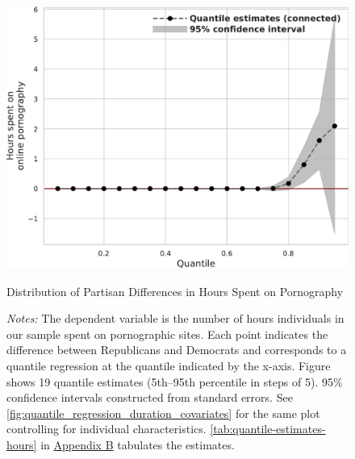 \documentclass[12pt,twoside]{article}
\begin{document}
\begin{figure}[t]
	\centering
	\includegraphics[width=.7\linewidth]{figs/quantile_reg_duration_adult.pdf}
	\caption{Distribution of Partisan Differences in Hours Spent on Pornography}
	\caption*{\footnotesize \emph{Notes:} 
		The dependent variable is the number of hours individuals in our sample spent on pornographic sites.
		Each point indicates the difference between Republicans and Democrats and corresponds to a quantile regression at the quantile indicated by the x-axis.
            Figure shows 19 quantile estimates (5th--95th percentile in steps of 5).
		95\% confidence intervals constructed from standard errors.
		See \cref{fig:quantile_regression_duration_covariates} for the same plot controlling for individual characteristics.
        \cref{tab:quantile-estimates-hours} in \hyperref[sm:smB]{Appendix B} tabulates the estimates.
	}
	\label{fig:quantile_regression_duration}
\end{figure}
\end{document}
